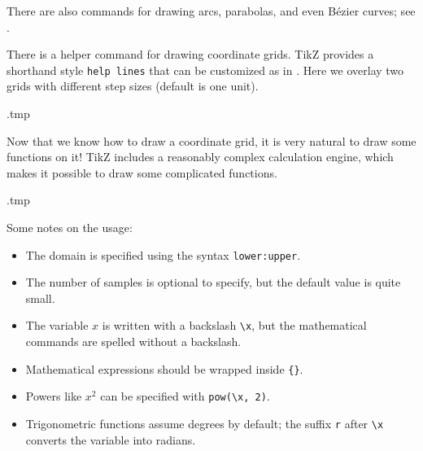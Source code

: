 There are also commands for drawing arcs, parabolas, and even Bézier curves;
see \cite[Section~14]{tikz}.

There is a helper command for drawing coordinate grids.
TikZ provides a shorthand style \verb|help lines|
that can be customized as in .
Here we overlay two grids with different step sizes (default is one unit).
%
\begin{VerbatimOut}{\jobname.tmp}
\centering
{}
\end{VerbatimOut}
\ShowExampleBelow[2]

Now that we know how to draw a coordinate grid,
it is very natural to draw some functions on it!
TikZ includes a reasonably complex calculation engine,
which makes it possible to draw some complicated functions.
%
\begin{VerbatimOut}{\jobname.tmp}
\centering
{}
\end{VerbatimOut}
\ShowExampleBelow[2]
Some notes on the usage:
\begin{itemize}
\item The domain is specified using the syntax \verb|lower:upper|.
\item The number of samples is optional to specify, but the default value is quite small.
\item The variable $x$ is written with a backslash \verb|\x|,
    but the mathematical commands are spelled without a backslash.
\item Mathematical expressions should be wrapped inside \verb|{}|.
\item Powers like $x^2$ can be specified with \verb|pow(\x, 2)|.
\item Trigonometric functions assume degrees by default;
    the suffix \verb|r| after \verb|\x| converts the variable into radians.
\end{itemize}

